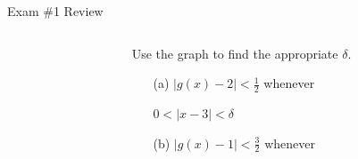 \documentclass[cal1spr16Lectures.tex]{subfiles}
\begin{document}
\begin{frame}[allowframebreaks]{Exam \#1 Review}
\begin{itemize}
\begin{ex}
\vspace{0.75pc}
\begin{columns}[T]
	\begin{column}{.25\textwidth}
	\end{column}
	\begin{column}{.55\textwidth}
	Use the graph to find the appropriate $\delta$.
	\begin{itemize}\footnotesize
	\item[(a)]$|g(x)-2|<\textstyle\frac{1}{2}$ whenever 
	
	\hspace{6pc}$0<|x-3|<\delta$
	\item[(b)]$|g(x)-1|<\textstyle\frac{3}{2}$ whenever 
	

\end{itemize}
\end{column}
\end{columns}
\end{ex}
\end{itemize}
\end{frame}
\end{document}
